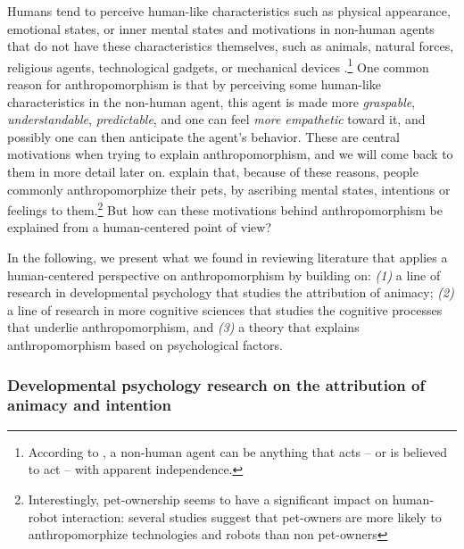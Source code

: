 \documentclass{frontiersSCNS} %
\begin{document}
Humans tend to perceive human-like characteristics such as physical appearance,
emotional states, or inner mental states and motivations in non-human agents
that do not have these characteristics themselves, such as animals, natural
forces, religious agents, technological gadgets, or mechanical devices
\citep{epley_when_2008}.\footnote{According to \citet{epley_when_2008}, a
non-human agent can be anything that acts -- or is believed to act -- with
apparent independence.} One common reason for anthropomorphism is that by
perceiving some human-like characteristics in the non-human agent, this agent is
made more \emph{graspable}, \emph{understandable}, \emph{predictable}, and one
can feel \emph{more empathetic} toward it, and possibly one can then anticipate
the agent's behavior. These are central motivations when trying to explain
anthropomorphism, and we will come back to them in more detail later on.
\citet{eddy_attribution_1993} explain that, because of these reasons, people
commonly anthropomorphize their pets, by ascribing mental states, intentions or
feelings to them.\footnote{Interestingly, pet-ownership seems to have a
significant impact on human-robot interaction: several studies suggest that
pet-owners are more likely to anthropomorphize technologies and robots than
non pet-owners} But how can these motivations behind anthropomorphism be
explained from a human-centered point of view?

In the following, we present what we found in reviewing literature that applies
a human-centered perspective on anthropomorphism by building on: \textit{(1)} a
line of research in developmental psychology that studies the attribution of
animacy; \textit{(2)} a line of research in more cognitive sciences that studies
the cognitive processes that underlie anthropomorphism, and \textit{(3)} a
theory that explains anthropomorphism based on psychological factors. 


\subsubsection{Developmental psychology research on the attribution of animacy and intention\\}
\label{sec:developmental-expl}
\end{document}
